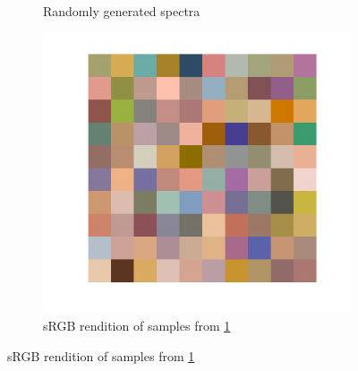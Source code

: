 \documentclass{jov}
\begin{document}
\begin{figure}
\begin{subfigure}[b]{0.3\textwidth}
        \caption{Randomly generated spectra}
        \label{fig:randomSurface}
    \end{subfigure}
    \begin{subfigure}[b]{0.3 \textwidth}
    \centering
        \includegraphics[width=\textwidth]{../Figures/Figure7/Figure7_c.pdf}
        \caption{sRGB rendition of samples from \ref{fig:randomSurface}}
        \label{fig:sRGBSurface}
    \end{subfigure}
    

\end{figure}
\end{document}
